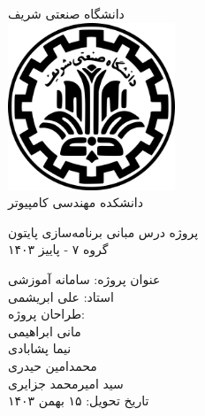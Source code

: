 \thispagestyle{empty}
\begin{center}
    {دانشگاه صنعتی شریف}\\
    \vspace{8mm}
    \includegraphics[width=5cm]{images/sharif.png}\\
    \vspace{12mm}
    {\large دانشکده مهندسی کامپیوتر}\\
    \vspace{16mm}

    {\huge پروژه درس مبانی برنامه‌سازی پایتون}\\
    \vspace{5mm}
    {\Large گروه ۷ - پاییز ۱۴۰۳}\\
    \vspace{5mm}

    {\Large عنوان پروژه: سامانه آموزشی }\\

    \vspace{12mm}
    {\Large استاد: علی ابریشمی}\\
    \vspace{20mm}
    {\large طراحان پروژه: }\\
    \vspace{4mm}
    {\large مانی ابراهیمی}\\
    {\large نیما پشابادی}\\
    {\large محمدامین حیدری}\\
    {\large سید امیرمحمد جزایری}\\

    \vspace{20mm}
    {\Large تاریخ تحویل: ۱۵ بهمن ۱۴۰۳}\\
\end{center}